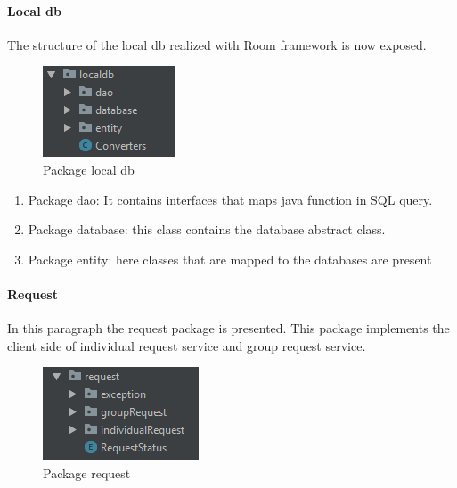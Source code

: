 \paragraph{Local db}
The structure of the local db realized with Room framework is now exposed.

\begin{figure}[H]
\includegraphics[width=\linewidth]{images/LocalDB.png}
\caption{ Package local db}
\label{fig:pkgsharedata}
\end{figure}

\begin{enumerate}
\item Package dao: It contains interfaces that maps java function in SQL query.
\item Package database: this class contains the database abstract class.
\item Package entity: here classes that are mapped to the databases are present 
\end{enumerate}

\paragraph{Request}
In this paragraph the request package is presented. 
This package implements the client side of individual request service and group request service.

\begin{figure}[H]
\includegraphics[width=\linewidth]{images/Request.png}
\caption{ Package request }
\label{fig:pkgsharedata}
\end{figure}

